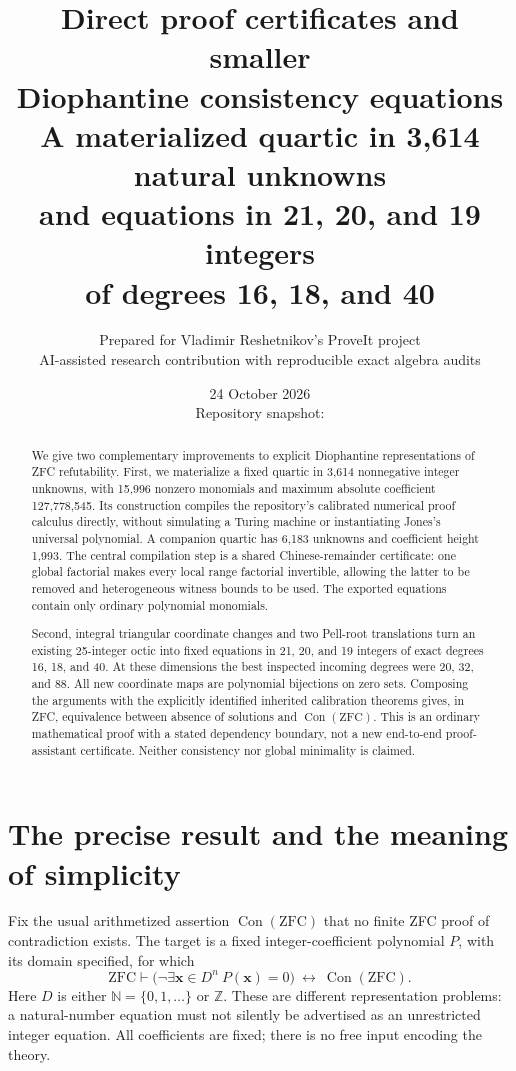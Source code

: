 \documentclass[11pt,letterpaper]{article}
\title{\color{ink}\LARGE Direct proof certificates and smaller\\Diophantine consistency equations\\[7pt]
\large A materialized quartic in 3,614 natural unknowns\\
and equations in 21, 20, and 19 integers\\
of degrees 16, 18, and 40}
\author{Prepared for Vladimir Reshetnikov's ProveIt project\\
\small AI-assisted research contribution with reproducible exact algebra audits}
\date{24 October 2026\\[3pt]\small Repository snapshot: \pin}
\newcommand{\N}{\mathbb N}
\newcommand{\Z}{\mathbb Z}
\newcommand{\Con}{\operatorname{Con}}
\newcommand{\ZFC}{\mathrm{ZFC}}
\begin{document}
\maketitle
\begin{abstract}
We give two complementary improvements to explicit Diophantine
representations of ZFC refutability. First, we materialize a fixed quartic
in 3,614 nonnegative integer unknowns, with 15,996 nonzero monomials and
maximum absolute coefficient 127,778,545. Its construction compiles the
repository's calibrated numerical proof calculus directly, without
simulating a Turing machine or instantiating Jones's universal polynomial.
A companion quartic has 6,183 unknowns and coefficient height 1,993.
The central compilation step is a shared Chinese-remainder certificate:
one global factorial makes every local range factorial invertible, allowing
the latter to be removed and heterogeneous witness bounds to be used.
The exported equations contain only ordinary polynomial monomials.

Second, integral triangular coordinate changes and two Pell-root
translations turn an existing 25-integer octic into fixed equations in
21, 20, and 19 integers of exact degrees 16, 18, and 40. At these dimensions
the best inspected incoming degrees were 20, 32, and 88.
All new coordinate maps are polynomial bijections on zero sets.
Composing the arguments with the explicitly identified inherited
calibration theorems gives, in ZFC, equivalence between absence of solutions
and $\Con(\ZFC)$. This is an ordinary mathematical proof with a stated
dependency boundary, not a new end-to-end proof-assistant certificate.
Neither consistency nor global minimality is claimed.
\end{abstract}
\newpage
\begingroup
\small
\setlength{\parskip}{0pt}
\tableofcontents
\endgroup
\newpage

\section{The precise result and the meaning of simplicity}

Fix the usual arithmetized assertion $\Con(\ZFC)$ that no finite ZFC proof
of contradiction exists. The target is a fixed integer-coefficient
polynomial $P$, with its domain specified, for which
\begin{equation}\label{eq:target}
 \ZFC\vdash
 \bigl(\neg\exists\boldsymbol{x}\in D^n\ P(\boldsymbol{x})=0\bigr)
 \ \longleftrightarrow\ \Con(\ZFC).
\end{equation}
Here $D$ is either $\N=\{0,1,\ldots\}$ or $\Z$. These are different
representation problems: a natural-number equation must not silently be
advertised as an unrestricted integer equation. All coefficients are fixed;
there is no free input encoding the theory.
\end{document}
